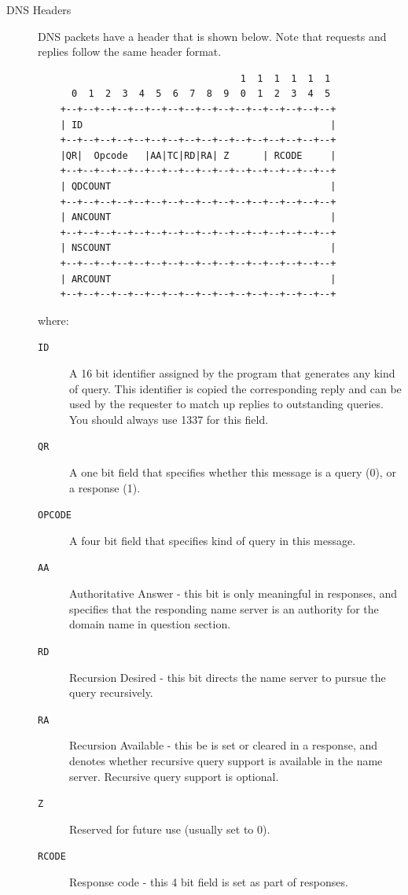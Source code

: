 \documentclass{article}
\begin{document}
\begin{description}
    \item[DNS Headers]
    DNS packets have a header that is shown below. Note that requests and replies follow the same header format.
    \begin{lstlisting}
                                    1  1  1  1  1  1
      0  1  2  3  4  5  6  7  8  9  0  1  2  3  4  5
    +--+--+--+--+--+--+--+--+--+--+--+--+--+--+--+--+
    | ID                                            |
    +--+--+--+--+--+--+--+--+--+--+--+--+--+--+--+--+
    |QR|  Opcode   |AA|TC|RD|RA| Z      | RCODE     |
    +--+--+--+--+--+--+--+--+--+--+--+--+--+--+--+--+
    | QDCOUNT                                       |
    +--+--+--+--+--+--+--+--+--+--+--+--+--+--+--+--+
    | ANCOUNT                                       |
    +--+--+--+--+--+--+--+--+--+--+--+--+--+--+--+--+
    | NSCOUNT                                       |
    +--+--+--+--+--+--+--+--+--+--+--+--+--+--+--+--+
    | ARCOUNT                                       |
    +--+--+--+--+--+--+--+--+--+--+--+--+--+--+--+--+
    \end{lstlisting}
    where:
    \begin{description}
        \item[{\tt ID}] A 16 bit identifier assigned by the program that generates any kind of query. This identifier is copied the corresponding reply and can be used by the requester to match up replies to outstanding queries. You should always use 1337 for this field.
        \item[{\tt QR}] A one bit field that specifies whether this message is a query (0), or a response (1).
        \item[{\tt OPCODE}] A four bit field that specifies kind of query in this message.
        \item[{\tt AA}] Authoritative Answer - this bit is only meaningful in responses, and specifies that the responding name server is an authority for the domain name in question section.
        \item[{\tt RD}] Recursion Desired - this bit directs the name server to pursue the query recursively.
        \item[{\tt RA}] Recursion Available - this be is set or cleared in a response, and denotes whether recursive query support is available in the name server. Recursive query support is optional.
        \item[{\tt Z}] Reserved for future use (usually set to 0).
        \item[{\tt RCODE}] Response code - this 4 bit field is set as part of responses.

\end{description}
\end{description}
\end{document}
